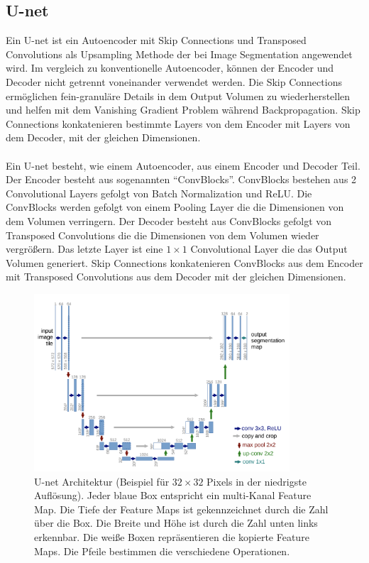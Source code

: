 \subsection{U-net}\label{section:u-net}
Ein U-net ist ein Autoencoder mit Skip Connections und Transposed Convolutions als Upsampling Methode der bei Image Segmentation angewendet wird.
Im vergleich zu konventionelle Autoencoder, können der Encoder und Decoder nicht getrennt voneinander verwendet werden. Die Skip Connections
ermöglichen fein-granuläre Details in dem Output Volumen zu wiederherstellen und helfen mit dem Vanishing Gradient Problem während Backpropagation. 
Skip Connections konkatenieren bestimmte Layers von dem Encoder mit Layers von dem Decoder, mit der gleichen Dimensionen.
\\
\\
Ein U-net besteht, wie einem Autoencoder, aus einem Encoder und Decoder Teil. Der Encoder besteht aus sogenannten ``ConvBlocks''. ConvBlocks
bestehen aus 2 Convolutional Layers gefolgt von Batch Normalization und ReLU. Die ConvBlocks werden gefolgt
von einem Pooling Layer die die Dimensionen von dem Volumen verringern. Der Decoder besteht aus ConvBlocks gefolgt von Transposed Convolutions
die die Dimensionen von dem Volumen wieder vergrößern. Das letzte Layer ist eine $1 \times 1$ Convolutional Layer die das Output Volumen generiert.
Skip Connections konkatenieren ConvBlocks aus dem Encoder mit Transposed Convolutions aus dem Decoder mit der gleichen Dimensionen.

\begin{figure}[H]
  \centering
  \includegraphics[width=0.85\textwidth]{resources/networks/unet.png}
  \caption{
    U-net Architektur (Beispiel für $32 \times 32$ Pixels in der niedrigste Auflösung). Jeder blaue Box entspricht ein multi-Kanal Feature Map.
    Die Tiefe der Feature Maps ist gekennzeichnet durch die Zahl über die Box. Die Breite und Höhe ist durch die Zahl unten links erkennbar.
    Die weiße Boxen repräsentieren die kopierte Feature Maps. Die Pfeile bestimmen die verschiedene Operationen.
    \cite{ronneberger2015unet}
  }
  \label{image:unet}
\end{figure}

